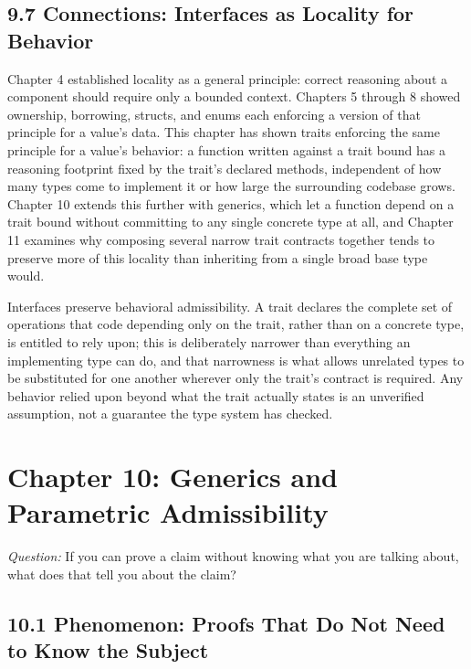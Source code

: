 \documentclass[11pt]{book}
\begin{document}
\section*{9.7 Connections: Interfaces as Locality for Behavior}

Chapter 4 established locality as a general principle: correct reasoning about a component should require only a bounded context. Chapters 5 through 8 showed ownership, borrowing, structs, and enums each enforcing a version of that principle for a value's data. This chapter has shown traits enforcing the same principle for a value's behavior: a function written against a trait bound has a reasoning footprint fixed by the trait's declared methods, independent of how many types come to implement it or how large the surrounding codebase grows. Chapter 10 extends this further with generics, which let a function depend on a trait bound without committing to any single concrete type at all, and Chapter 11 examines why composing several narrow trait contracts together tends to preserve more of this locality than inheriting from a single broad base type would.

\begin{invariantbox}
Interfaces preserve behavioral admissibility. A trait declares the complete set of operations that code depending only on the trait, rather than on a concrete type, is entitled to rely upon; this is deliberately narrower than everything an implementing type can do, and that narrowness is what allows unrelated types to be substituted for one another wherever only the trait's contract is required. Any behavior relied upon beyond what the trait actually states is an unverified assumption, not a guarantee the type system has checked.
\end{invariantbox}

\clearpage

\chapter*{Chapter 10: Generics and Parametric Admissibility}

\begin{firstprinciples}
\textit{Question:} If you can prove a claim without knowing what you are talking about, what does that tell you about the claim?
\end{firstprinciples}

\section*{10.1 Phenomenon: Proofs That Do Not Need to Know the Subject}
\end{document}
